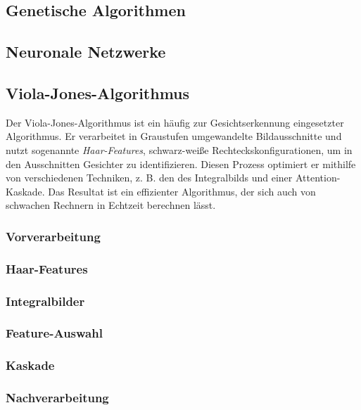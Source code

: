 \documentclass[doktyp=semarbeit, sprache=german]{TUBAFarbeiten}
\begin{document}
\subsection{Genetische Algorithmen}

\subsection{Neuronale Netzwerke}

\subsection{Viola-Jones-Algorithmus}
Der Viola-Jones-Algorithmus ist ein häufig zur Gesichtserkennung eingesetzter Algorithmus. Er verarbeitet in Graustufen umgewandelte Bildausschnitte und nutzt sogenannte \textit{Haar-Features}, schwarz-weiße Rechteckskonfigurationen, um in den Ausschnitten Gesichter zu identifizieren. Diesen Prozess optimiert er mithilfe von verschiedenen Techniken, z. B. den des Integralbilds und einer Attention-Kaskade. Das Resultat ist ein effizienter Algorithmus, der sich auch von schwachen Rechnern in Echtzeit berechnen lässt.

\subsubsection{Vorverarbeitung}
\subsubsection{Haar-Features}
\subsubsection{Integralbilder}
\subsubsection{Feature-Auswahl}
\subsubsection{Kaskade}
\subsubsection{Nachverarbeitung}
\end{document}
